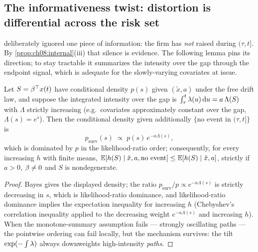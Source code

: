 \subsection{The informativeness twist: distortion is differential across
the risk set}\label{ch08:sec:twist}

 deliberately ignored one
piece of information: the firm has \emph{not} raised during
$(\tau, t]$. By \cref{prop:ch08:internal}(iii) that silence is evidence.
The following lemma pins its direction; to stay tractable it summarizes
the intensity over the gap through the endpoint signal, which is
adequate for the slowly-varying covariates at issue.

\begin{lemma}\label{lem:ch08:tilt}
Let $S = \beta^{\top}x(t)$ have conditional density $p(s)$ given
$(\tilde x, a)$ under the free drift law, and suppose the integrated
intensity over the gap is $\int_\tau^t \lambda(u)\,\mathrm{d} u = a\,\Lambda(S)$
with $\Lambda$ strictly increasing (e.g.\ covariates approximately
constant over the gap, $\Lambda(s) = e^{s}$). Then the conditional
density given additionally $\{$no event in $(\tau, t]\}$ is
\[
p_{\mathrm{surv}}(s) \;\propto\; p(s)\, e^{-a\Lambda(s)},
\]
which is dominated by $p$ in the likelihood-ratio order; consequently,
for every increasing $h$ with finite means,
$\mathbb{E}[h(S) \mid \tilde x, a, \text{no event}] \le \mathbb{E}[h(S) \mid \tilde x, a]$,
strictly if $a > 0$, $\beta \ne 0$ and $S$ is nondegenerate.
\end{lemma}

\begin{proof}
Bayes gives the displayed density; the ratio
$p_{\mathrm{surv}}/p \propto e^{-a\Lambda(s)}$ is strictly decreasing in
$s$, which is likelihood-ratio dominance, and likelihood-ratio dominance
implies the expectation inequality for increasing $h$ (Chebyshev's
correlation inequality applied to the decreasing weight
$e^{-a\Lambda(s)}$ and increasing $h$). When the monotone-summary
assumption fails --- strongly oscillating paths --- the pointwise
ordering can fail locally, but the mechanism survives: the tilt
$\exp(-\int\lambda)$ always downweights high-intensity \emph{paths}.
\end{proof}

